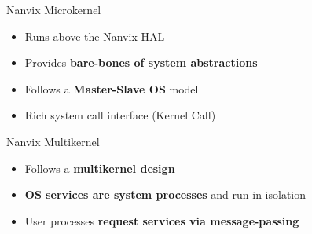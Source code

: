 		\begin{frame}[fragile]{Nanvix Microkernel}

			\begin{itemize}
				\item Runs above the Nanvix HAL
				\item Provides \textbf{bare-bones of system abstractions}
				\item Follows a \textbf{Master-Slave OS} model
				\item Rich system call interface (Kernel Call)
			\end{itemize}


		\end{frame}

		\begin{frame}[fragile]{Nanvix Multikernel}

			\begin{itemize}
				\item Follows a \textbf{multikernel design}
				\item \textbf{OS services are system processes} and run in isolation
				\item User processes \textbf{request services via message-passing}
			\end{itemize}


		\end{frame}

